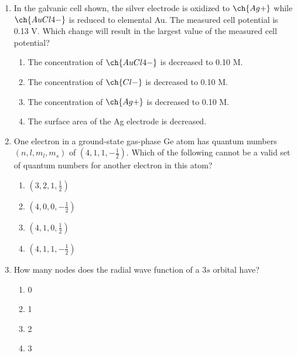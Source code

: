 \documentclass[twocolumn,10pt]{article}
\begin{document}
\begin{enumerate}[label=\arabic*., leftmargin=*]
\item In the galvanic cell shown, the silver electrode is oxidized to $\ch{Ag+}$ while $\ch{AuCl4-}$ is reduced to elemental Au. The measured cell potential is 0.13 V. Which change will result in the largest value of the measured cell potential?
\begin{center}
\end{center}
\begin{enumerate}[label=(\Alph*)]
    \item The concentration of $\ch{AuCl4-}$ is decreased to 0.10 M.
    \item The concentration of $\ch{Cl-}$ is decreased to 0.10 M.
    \item The concentration of $\ch{Ag+}$ is decreased to 0.10 M.
    \item The surface area of the Ag electrode is decreased.
\end{enumerate}

\item One electron in a ground-state gas-phase Ge atom has quantum numbers $(n, l, m_l, m_s)$ of $(4, 1, 1, -\frac{1}{2})$. Which of the following cannot be a valid set of quantum numbers for another electron in this atom?
\begin{enumerate}[label=(\Alph*)]
    \item $(3, 2, 1, \frac{1}{2})$ \item $(4, 0, 0, -\frac{1}{2})$ \item $(4, 1, 0, \frac{1}{2})$ \item $(4, 1, 1, -\frac{1}{2})$
\end{enumerate}

\item How many nodes does the radial wave function of a $3s$ orbital have?
\begin{enumerate}[label=(\Alph*)]
    \item 0 \item 1 \item 2 \item 3
\end{enumerate}


\end{enumerate}
\end{document}
